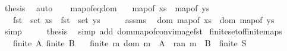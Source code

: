 \begin{isabellebody}
\ {\isacharquery}{\kern0pt}thesis\ \isamarkupfalse%
\ auto\isanewline
\ \ \isamarkupfalse%
\isanewline
{}\isamarkupfalse%
%
\endisatagproof
{\isafoldproof}%
%
\isadelimproof
\isanewline
%
\endisadelimproof
\isanewline
{}\isamarkupfalse%
\ map{\isacharunderscore}{\kern0pt}of{\isacharunderscore}{\kern0pt}eq{\isacharunderscore}{\kern0pt}dom{\isacharcolon}{\kern0pt}\isanewline
\ \ \ {\isachardoublequoteopen}map{\isacharunderscore}{\kern0pt}of\ xs\ {\isacharequal}{\kern0pt}\ map{\isacharunderscore}{\kern0pt}of\ ys{\isachardoublequoteclose}\isanewline
\ \ \ {\isachardoublequoteopen}fst\ {\isacharbackquote}{\kern0pt}\ set\ xs\ {\isacharequal}{\kern0pt}\ fst\ {\isacharbackquote}{\kern0pt}\ set\ ys{\isachardoublequoteclose}\isanewline
%
\isadelimproof
%
\endisadelimproof
%
\isatagproof
{}\isamarkupfalse%
\ {\isacharminus}{\kern0pt}\isanewline
\ \ \isamarkupfalse%
\ assms\ \isamarkupfalse%
\ {\isachardoublequoteopen}dom\ {\isacharparenleft}{\kern0pt}map{\isacharunderscore}{\kern0pt}of\ xs{\isacharparenright}{\kern0pt}\ {\isacharequal}{\kern0pt}\ dom\ {\isacharparenleft}{\kern0pt}map{\isacharunderscore}{\kern0pt}of\ ys{\isacharparenright}{\kern0pt}{\isachardoublequoteclose}\ \isamarkupfalse%
\ simp\isanewline
\ \ \isamarkupfalse%
\ \isamarkupfalse%
\ {\isacharquery}{\kern0pt}thesis\ \isamarkupfalse%
\ {\isacharparenleft}{\kern0pt}simp\ add{\isacharcolon}{\kern0pt}\ dom{\isacharunderscore}{\kern0pt}map{\isacharunderscore}{\kern0pt}of{\isacharunderscore}{\kern0pt}conv{\isacharunderscore}{\kern0pt}image{\isacharunderscore}{\kern0pt}fst{\isacharparenright}{\kern0pt}\isanewline
{}\isamarkupfalse%
%
\endisatagproof
{\isafoldproof}%
%
\isadelimproof
\isanewline
%
\endisadelimproof
\isanewline
{}\isamarkupfalse%
\ finite{\isacharunderscore}{\kern0pt}set{\isacharunderscore}{\kern0pt}of{\isacharunderscore}{\kern0pt}finite{\isacharunderscore}{\kern0pt}maps{\isacharcolon}{\kern0pt}\isanewline
\ \ \ {\isachardoublequoteopen}finite\ A{\isachardoublequoteclose}\ {\isachardoublequoteopen}finite\ B{\isachardoublequoteclose}\isanewline
\ \ \ {\isachardoublequoteopen}finite\ {\isacharbraceleft}{\kern0pt}m{\isachardot}{\kern0pt}\ dom\ m\ {\isacharequal}{\kern0pt}\ A\ {\isasymand}\ ran\ m\ {\isasymsubseteq}\ B{\isacharbraceright}{\kern0pt}{\isachardoublequoteclose}\ {\isacharparenleft}{\kern0pt}\ {\isachardoublequoteopen}finite\ {\isacharquery}{\kern0pt}S{\isachardoublequoteclose}{\isacharparenright}{\kern0pt}\isanewline

\end{isabellebody}
